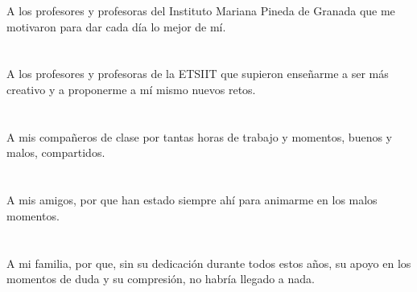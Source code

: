 A los profesores y profesoras del Instituto Mariana Pineda de Granada que me motivaron para
dar cada día lo mejor de mí.\\ \\ \\

A los profesores y profesoras de la ETSIIT que supieron enseñarme a ser más creativo y a proponerme a mí mismo nuevos retos.\\ \\ \\

A mis compañeros de clase por tantas horas de trabajo y momentos, buenos y malos, compartidos.\\ \\ \\

A mis amigos, por que han estado siempre ahí para animarme en los malos momentos.\\ \\ \\

A mi familia, por que, sin su dedicación durante todos estos años, su apoyo en los momentos
de duda y su compresión, no habría llegado a nada.
